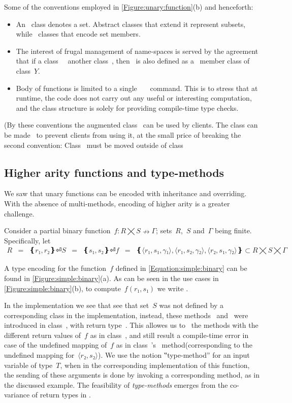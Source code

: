 Some of the conventions employed in \cref{Figure:unary:function}(b) and henceforth:
\begin{itemize}
  \item An~ class denotes a set. Abstract classes that extend it represent
      subsets, while~ classes that encode set members.
  \item The interest of frugal management of name-spaces is served by the agreement that if
    a class~~ another class~, then~ is also defined
    as a~ member class of class~$Y$.
  \item Body of functions is limited to a single~~~\cc{;} command.
    This is to stress that at runtime, the code does not carry out any useful or interesting computation,
      and the class structure is solely for providing compile-time type checks.
\end{itemize}
(By these conventions the augmented class~ can be used by clients.
The class can be made~ to prevent clients from using it,
  at the small price of breaking the second convention:
  Class~ must be moved outside of class~

\subsection{Higher arity functions and type-methods}
We saw that unary functions can be encoded with inheritance and overriding.
With the absence of multi-methods, encoding of higher arity is a greater challenge.

Consider a partial binary function~$f: R⨉S↛Γ$; sets~$R$,~$S$ and~$Γ$ being finite.
Specifically, let
\begin{equation}
  \label{Equation:simple:binary}
  \begin{array}{rlc}
    R & = & ❴ r₁, r₂❵⏎
    S & = & ❴ s₁, s₂❵⏎
    f & = & ❴ ⟨r₁, s₁,γ₁⟩, ⟨r₁, s₂,γ₂⟩, ⟨r₂, s₁,γ₂⟩ ❵ ⊂ R⨉S⨉Γ
  \end{array}
\end{equation}

A \Java type encoding for the function~$f$ defined in \cref{Equation:simple:binary}
  can be found in \cref{Figure:simple:binary}(a).
As can be seen in the use cases in \cref{Figure:simple:binary}(b),
  to compute~$f(r₁,s₁)$ we write .

In the implementation we see that see that set~$S$ was not defined by a corresponding class in
  the implementation, instead, these methods~ and~ were introduced in
  class~, with return type~.
This allowes us to~ the methods with the different return values of~$f$ as
 in class~, and still result a compile-time error in case of the undefined mapping of~$f$
 as in class~'s~ method(corresponding to the undefined mapping for~$⟨r₂, s₂⟩$).
We use the notion ‟type-method” for an input variable of type~$T$, when in the
  corresponding implementation of this function, the sending of these arguments is done
  by invoking a corresponding method, as in the discussed example.
The feasibility of \emph{type-methods} emerges from the co-variance of return types in
  \Java.

